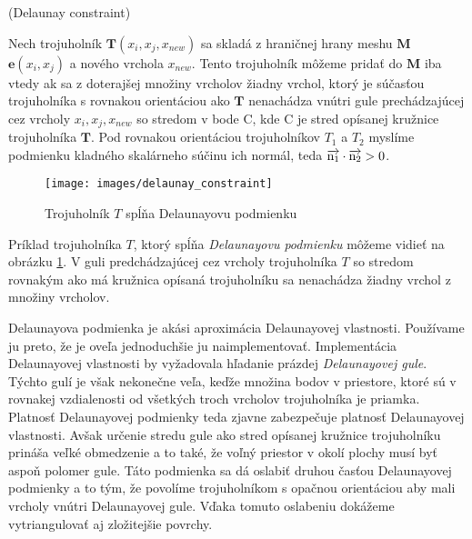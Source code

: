 \begin{definition}
    (Delaunay constraint)

    Nech trojuholník $\mathbf{T}(x_i, x_j, x_{new})$ sa skladá z hraničnej hrany meshu $\mathbf{M}$ 
    $\mathbf{e}(x_i, x_j)$ a nového vrchola $x_{new}$. Tento trojuholník môžeme pridať do 
    $\mathbf{M}$ iba vtedy ak sa z doterajšej 
    množiny vrcholov žiadny vrchol, ktorý je súčasťou trojuholníka s rovnakou orientáciou ako 
    $\mathbf{T}$ nenachádza vnútri gule prechádzajúcej cez vrcholy $x_i, x_j, x_{new}$ so stredom 
    v bode C, kde C je stred opísanej kružnice trojuholníka $\mathbf{T}$. Pod rovnakou orientáciou 
    trojuholníkov $T_1$ a $T_2$ myslíme podmienku kladného skalárneho súčinu ich normál, teda 
    $\overrightarrow{\rm n_1} \cdot \overrightarrow{\rm n_2} > 0$.
\end{definition}

\begin{figure}
    \centerline{\texttt{[image: images/delaunay\_constraint]}}
    \caption[\cite{hilton1996marching} Trojuholník $T$ spĺňa Delaunayovu podmienku]{\cite{hilton1996marching} Trojuholník $T$ spĺňa Delaunayovu podmienku}
    \label{obr:delaunay_constraint}
\end{figure}

Príklad trojuholníka $T$, ktorý spĺňa \textit{Delaunayovu podmienku} môžeme vidieť na obrázku 
\ref{obr:delaunay_constraint}. V guli predchádzajúcej cez vrcholy trojuholníka $T$ so stredom 
rovnakým ako má kružnica opísaná trojuholníku sa nenachádza žiadny vrchol z množiny vrcholov.

Delaunayova podmienka je akási aproximácia Delaunayovej vlastnosti. Používame ju preto, že 
je oveľa jednoduchšie ju naimplementovať. Implementácia Delaunayovej vlastnosti by vyžadovala
hľadanie prázdej \textit{Delaunayovej gule}. Týchto gulí je však nekonečne veľa, keďže množina
bodov v priestore, ktoré sú v rovnakej vzdialenosti od všetkých troch vrcholov trojuholníka je priamka.
Platnosť Delaunayovej podmienky teda zjavne zabezpečuje platnosť Delaunayovej vlastnosti.
Avšak určenie stredu gule ako stred opísanej kružnice trojuholníku prináša veľké obmedzenie a to také,
že voľný priestor v okolí plochy musí byť aspoň polomer gule. Táto podmienka sa dá oslabiť druhou časťou
Delaunayovej podmienky a to tým, že povolíme trojuholníkom s opačnou orientáciou aby mali vrcholy vnútri
Delaunayovej gule. Vďaka tomuto oslabeniu dokážeme vytriangulovať aj zložitejšie povrchy.



